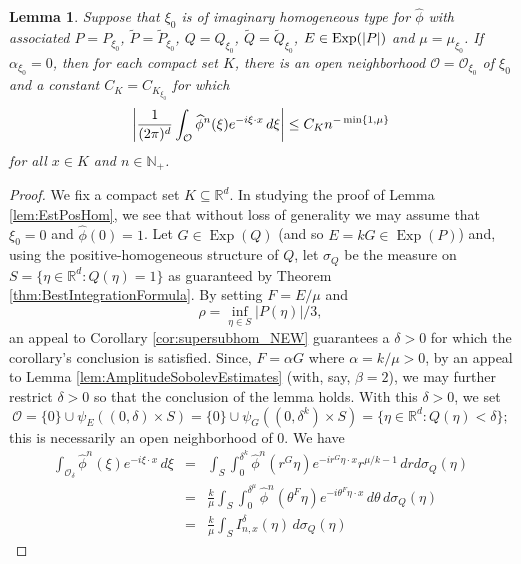 \documentclass[11pt]{article}
\newtheorem{lemma}[theorem]{Lemma}
\newcommand\Exp{\operatorname{Exp}}
\newcommand{\f}[2]{\frac{#1}{#2}}
\begin{document}
\begin{lemma}
Suppose that $\xi_0$ is of imaginary homogeneous type for $\widehat{\phi}$ with associated $P=P_{\xi_0}$, $\widetilde{P}=\widetilde{P}_{\xi_0}$,  $Q=Q_{\xi_0}$, $\widetilde{Q}=\widetilde{Q}_{\xi_0}$, $E\in\Exp(\abs{P})$ and $\mu=\mu_{\xi_0}$. If $\alpha_{\xi_0}=0$, then for each compact set $K$, there is an open neighborhood $\mathcal{O}=\mathcal{O}_{\xi_0}$ of $\xi_0$ and a constant $C_K=C_{K_{\xi_0}}$ for which
\begin{equation*}
    \abs{\f{1}{(2\pi)^d}\int_{\mathcal{O}}\widehat{\phi}^n(\xi)e^{-i\xi\cdot x}\,d\xi}\leq C_Kn^{-\min\{1,\mu\}}
\end{equation*}
for all $x\in K$ and $n\in\mathbb{N}_+$.
\end{lemma}
\begin{proof}
We fix a compact set $K\subseteq\mathbb{R}^d$. In studying the proof of Lemma \ref{lem:EstPosHom}, we see that without loss of generality we may assume that $\xi_0=0$ and $\widehat{\phi}(0)=1$. Let $G\in \Exp(Q)$ (and so $E=kG\in \Exp(P)$) and, using the positive-homogeneous structure of $Q$, let $\sigma_Q$ be the measure on $S=\{\eta\in \mathbb{R}^d:Q(\eta)=1\}$ as guaranteed by Theorem \ref{thm:BestIntegrationFormula}. By setting $F=E/\mu$ and
\begin{equation*}
    \rho=\inf_{\eta\in S}|P(\eta)|/3,
\end{equation*}
an appeal to Corollary \ref{cor:supersubhom_NEW} guarantees a $\delta>0$ for which the corollary's conclusion is satisfied. Since, $F=\alpha G$ where $\alpha=k/\mu>0$, by an appeal to Lemma \ref{lem:AmplitudeSobolevEstimates} (with, say, $\beta=2$), we may further restrict $\delta>0$ so that the conclusion of the lemma holds. With this $\delta>0$, we set
\begin{equation*}
    \mathcal{O}=\{0\}\cup\psi_E((0,\delta)\times S)=\{0\}\cup \psi_G((0,\delta^{k})\times S)=\{\eta\in\mathbb{R}^d:Q(\eta)<\delta\};
\end{equation*}
this is necessarily an open neighborhood of $0$. We have
\begin{eqnarray*}
    \int_{\mathcal{O}_{\delta}}\widehat{\phi}^n(\xi)e^{-i\xi\cdot x}\,d\xi
    &=&
    \int_S\int_0^{\delta^{k}}\widehat{\phi}^n(r^G\eta)e^{-ir^G\eta\cdot x}r^{\mu/k-1}\,dr d\sigma_Q(\eta)\\
    &=&
    \frac{k}{\mu}\int_S \int_0^{\delta^{\mu}} \widehat{\phi}^n(\theta^{F} \eta) e^{-i \theta^F \eta\cdot x}  \,d\theta \,d\sigma_Q(\eta)\\
    &=&
    \frac{k}{\mu}\int_S I^\delta_{n,x}(\eta)\,d\sigma_Q(\eta)

\end{eqnarray*}
\end{proof}
\end{document}
